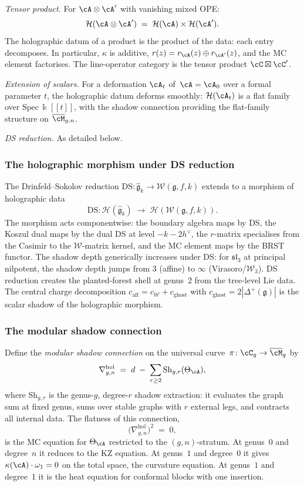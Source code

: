\smallskip\noindent
\emph{Tensor product.}\enspace
For $\cA\otimes\cA'$ with vanishing mixed OPE:
\[
\mathcal H(\cA\otimes\cA')
\;=\;
\mathcal H(\cA)\times\mathcal H(\cA').
\]
The holographic datum of a product is the product of the data:
each entry decomposes. In particular, $\kappa$ is additive,
$r(z)=r_\cA(z)\oplus r_{\cA'}(z)$, and the MC element
factorises. The line-operator category is the tensor product
$\cC\boxtimes\cC'$.

\smallskip\noindent
\emph{Extension of scalars.}\enspace
For a deformation $\cA_t$ of~$\cA=\cA_0$ over a formal parameter
$t$, the holographic datum deforms smoothly:
$\mathcal H(\cA_t)$ is a flat family over $\mathrm{Spec}\,
\Bbbk[\![t]\!]$, with the shadow connection providing the
flat-family structure on $\overline{\cM}_{g,n}$.

\smallskip\noindent
\emph{DS reduction.}\enspace
As detailed below.

\subsubsection*{The holographic morphism under DS reduction}

The Drinfeld--Sokolov reduction $\mathrm{DS}\colon
\widehat{\mathfrak g}_k\to\mathcal W(\mathfrak g,f,k)$
extends to a morphism of holographic data
\[
\mathrm{DS}\colon
\mathcal H(\widehat{\mathfrak g}_k)
\;\longrightarrow\;
\mathcal H(\mathcal W(\mathfrak g,f,k)).
\]
The morphism acts componentwise: the boundary algebra maps by DS,
the Koszul dual maps by the dual DS at level $-k-2h^\vee$, the
$r$-matrix specialises from the Casimir to the $\mathcal W$-matrix
kernel, and the MC element maps by the BRST functor. The shadow
depth generically increases under DS: for $\mathfrak{sl}_3$
at principal nilpotent, the shadow depth jumps from $3$ (affine) to
$\infty$ (Virasoro/$\mathcal W_3$). DS reduction creates the
planted-forest shell at genus~$2$ from the tree-level Lie data.
The central charge decomposition $c_{\mathrm{aff}}=c_{\mathcal W}
+c_{\mathrm{ghost}}$ with $c_{\mathrm{ghost}}
=2|\Delta^+(\mathfrak g)|$ is the scalar shadow of the
holographic morphism.

\subsubsection*{The modular shadow connection}

Define the \emph{modular shadow connection} on the universal
curve~$\pi\colon\cC_g\to\overline{\cM}_g$ by
\[
\nabla^{\mathrm{hol}}_{g,n}
\;=\;
d\;-\;\sum_{r\ge 2}\mathrm{Sh}_{g,r}(\Theta_\cA),
\]
where $\mathrm{Sh}_{g,r}$ is the genus-$g$, degree-$r$ shadow
extraction: it evaluates the graph sum at fixed genus, sums over
stable graphs with $r$ external legs, and contracts all internal
data. The flatness of this connection,
\[
\bigl(\nabla^{\mathrm{hol}}_{g,n}\bigr)^2\;=\;0,
\]
is the MC equation for $\Theta_\cA$ restricted to the
$(g,n)$-stratum. At genus~$0$ and degree~$n$ it reduces to the
KZ equation. At genus~$1$ and degree~$0$ it gives
$\kappa(\cA)\cdot\omega_1=0$ on the total space, the curvature
equation. At genus~$1$ and degree~$1$ it is the heat equation for
conformal blocks with one insertion.

